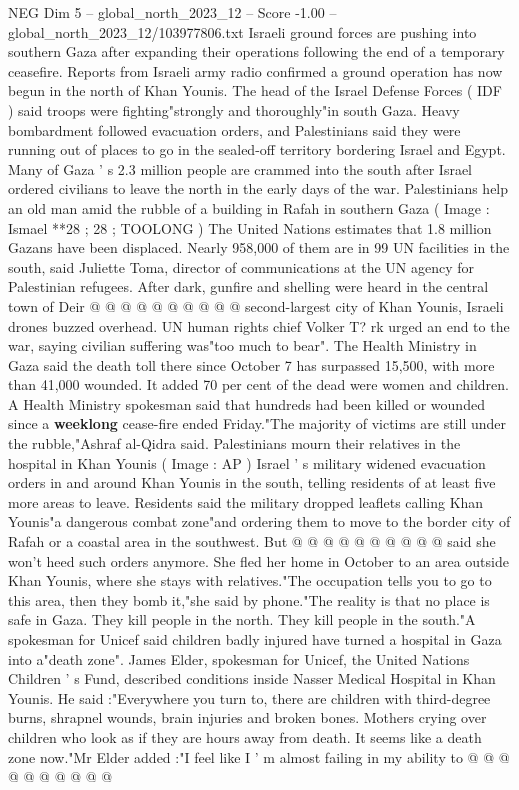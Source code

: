 \begin{textsample}{NEG Dim 5 – global\_north\_2023\_12 – Score -1.00 – global\_north\_2023\_12/103977806.txt}  \label{ex:f5_neg_056}
Israeli ground forces are pushing into southern Gaza after expanding their operations following the end of a temporary ceasefire.
Reports from Israeli army radio confirmed a ground operation has now begun in the north of Khan Younis.
The head of the Israel Defense Forces ( IDF ) said troops were fighting"strongly and thoroughly"in south Gaza.
Heavy bombardment followed evacuation orders, and Palestinians said they were running out of places to go in the sealed-off territory bordering Israel and Egypt.
Many of Gaza ' s 2.3 million people are crammed into the south after Israel ordered civilians to leave the north in the early days of the war.
Palestinians help an old man amid the rubble of a building in Rafah in southern Gaza ( Image : Ismael **28 ; 28 ; TOOLONG ) The United Nations estimates that 1.8 million Gazans have been displaced.
Nearly 958,000 of them are in 99 UN facilities in the south, said Juliette Toma, director of communications at the UN agency for Palestinian refugees.
After dark, gunfire and shelling were heard in the central town of Deir @ @ @ @ @ @ @ @ @ @ second-largest city of Khan Younis, Israeli drones buzzed overhead.
UN human rights chief Volker T? rk urged an end to the war, saying civilian suffering was"too much to bear".
The Health Ministry in Gaza said the death toll there since October 7 has surpassed 15,500, with more than 41,000 wounded.
It added 70 per cent of the dead were women and children.
A Health Ministry spokesman said that hundreds had been killed or wounded since a \textbf{weeklong} cease-fire ended Friday."The majority of victims are still under the rubble,"Ashraf al-Qidra said.
Palestinians mourn their relatives in the hospital in Khan Younis ( Image : AP ) Israel ' s military widened evacuation orders in and around Khan Younis in the south, telling residents of at least five more areas to leave.
Residents said the military dropped leaflets calling Khan Younis"a dangerous combat zone"and ordering them to move to the border city of Rafah or a coastal area in the southwest.
But @ @ @ @ @ @ @ @ @ @ said she won't heed such orders anymore.
She fled her home in October to an area outside Khan Younis, where she stays with relatives."The occupation tells you to go to this area, then they bomb it,"she said by phone."The reality is that no place is safe in Gaza.
They kill people in the north.
They kill people in the south."A spokesman for Unicef said children badly injured have turned a hospital in Gaza into a"death zone".
James Elder, spokesman for Unicef, the United Nations Children ' s Fund, described conditions inside Nasser Medical Hospital in Khan Younis.
He said :"Everywhere you turn to, there are children with third-degree burns, shrapnel wounds, brain injuries and broken bones.
Mothers crying over children who look as if they are hours away from death.
It seems like a death zone now."Mr Elder added :"I feel like I ' m almost failing in my ability to @ @ @ @ @ @ @ @ @ @

\end{textsample}
